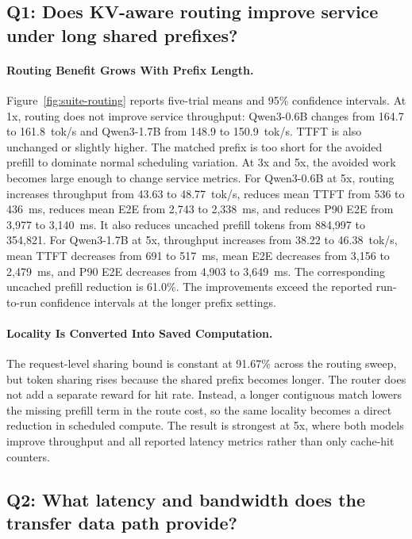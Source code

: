 \documentclass{article}
\begin{document}
\subsection{Q1: Does KV-aware routing improve service under long shared prefixes?}

\paragraph{Routing Benefit Grows With Prefix Length.} Figure~\ref{fig:suite-routing} reports five-trial means and 95\% confidence intervals. At 1x, routing does not improve service throughput: Qwen3-0.6B changes from 164.7 to 161.8~tok/s and Qwen3-1.7B from 148.9 to 150.9~tok/s. TTFT is also unchanged or slightly higher. The matched prefix is too short for the avoided prefill to dominate normal scheduling variation. At 3x and 5x, the avoided work becomes large enough to change service metrics. For Qwen3-0.6B at 5x, routing increases throughput from 43.63 to 48.77~tok/s, reduces mean TTFT from 536 to 436~ms, reduces mean E2E from 2,743 to 2,338~ms, and reduces P90 E2E from 3,977 to 3,140~ms. It also reduces uncached prefill tokens from 884,997 to 354,821. For Qwen3-1.7B at 5x, throughput increases from 38.22 to 46.38~tok/s, mean TTFT decreases from 691 to 517~ms, mean E2E decreases from 3,156 to 2,479~ms, and P90 E2E decreases from 4,903 to 3,649~ms. The corresponding uncached prefill reduction is 61.0\%. The improvements exceed the reported run-to-run confidence intervals at the longer prefix settings.

\paragraph{Locality Is Converted Into Saved Computation.} The request-level sharing bound is constant at 91.67\% across the routing sweep, but token sharing rises because the shared prefix becomes longer. The router does not add a separate reward for hit rate. Instead, a longer contiguous match lowers the missing prefill term in the route cost, so the same locality becomes a direct reduction in scheduled compute. The result is strongest at 5x, where both models improve throughput and all reported latency metrics rather than only cache-hit counters.

\subsection{Q2: What latency and bandwidth does the transfer data path provide?}
\end{document}
